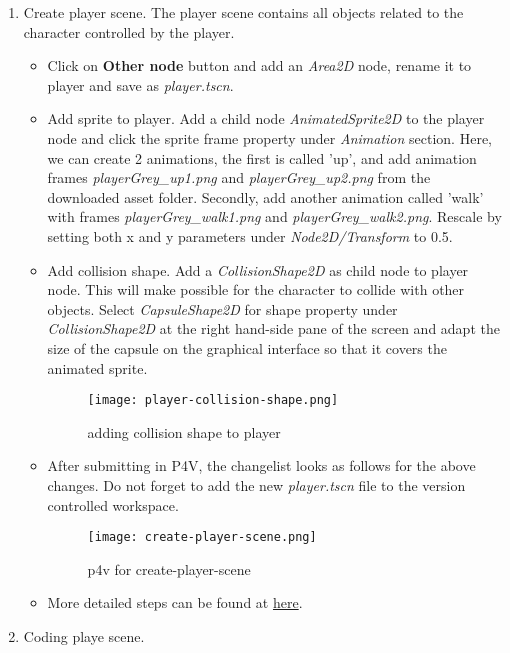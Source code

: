\begin{enumerate}
    \item Create player scene. The player scene contains all objects related to the character controlled by the player.
    \begin{itemize}
        \item Click on \textbf{Other node} button and add an \textit{Area2D} node, rename it to player and save as 
        \textit{player.tscn}.
        \item Add sprite to player. Add a child node \textit{AnimatedSprite2D} to the player node and click the sprite frame
        property under \textit{Animation} section. Here, we can create 2 animations, the first is called 'up', and add 
        animation frames \textit{playerGrey\_up1.png} and \textit{playerGrey\_up2.png} from the downloaded asset folder.
        Secondly, add another animation called 'walk' with frames 
        \textit{playerGrey\_walk1.png} and \textit{playerGrey\_walk2.png}. Rescale by setting both x and y parameters under 
        \textit{Node2D/Transform} to 0.5.
        \item Add collision shape. Add a \textit{CollisionShape2D} as child node to player node. This will make possible
        for the character to collide with other objects. Select \textit{CapsuleShape2D} for shape property under 
        \textit{CollisionShape2D} at the right hand-side pane of the screen and adapt the size of the capsule on the 
        graphical interface so that it covers the animated sprite.
        \begin{figure}[H]
            \centering
            \texttt{[image: player-collision-shape.png]}
              \caption{adding collision shape to player}
              \label{fig:player-collision-shape}
        \end{figure}
        \item After submitting in P4V, the changelist looks as follows for the above changes. Do not forget to add 
        the new \textit{player.tscn} file to the version controlled workspace.
        \begin{figure}[H]
            \centering
            \texttt{[image: create-player-scene.png]}
              \caption{p4v for create-player-scene}
              \label{fig:create-player-scene}
        \end{figure}
        \item More detailed steps can be found at 
        \href{https://docs.godotengine.org/en/stable/getting_started/first_2d_game/02.player_scene.html}{\color{blue}here}.
    \end{itemize}
    \item Coding playe scene.
\end{enumerate}
